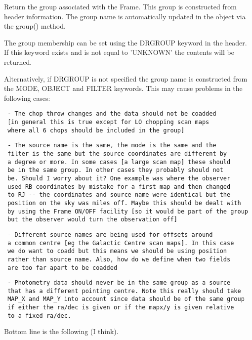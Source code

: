 \begin{description}
Return the group associated with the Frame. This group is constructed
from header information. The group name is automatically updated in
the object via the group() method.



The group membership can be set using the DRGROUP keyword in the
header. If this keyword exists and is not equal to 'UNKNOWN' the
contents will be returned.



Alternatively, if DRGROUP is not specified the group name is
constructed from the MODE, OBJECT and FILTER keywords. This may cause
problems in the following cases:

\begin{verbatim}
 - The chop throw changes and the data should not be coadded
 [in general this is true except for LO chopping scan maps
 where all 6 chops should be included in the group]
\end{verbatim}
\begin{verbatim}
 - The source name is the same, the mode is the same and the
 filter is the same but the source coordinates are different by
 a degree or more. In some cases [a large scan map] these should
 be in the same group. In other cases they probably should not
 be. Should I worry about it? One example was where the observer
 used RB coordinates by mistake for a first map and then changed
 to RJ -- the coordinates and source name were identical but the
 position on the sky was miles off. Maybe this should be dealt with
 by using the Frame ON/OFF facility [so it would be part of the group
 but the observer would turn the observation off]
\end{verbatim}
\begin{verbatim}
 - Different source names are being used for offsets around
 a common centre [eg the Galactic Centre scan maps]. In this case
 we do want to coadd but this means we should be using position
 rather than source name. Also, how do we define when two fields
 are too far apart to be coadded
\end{verbatim}
\begin{verbatim}
 - Photometry data should never be in the same group as a source
 that has a different pointing centre. Note this really should take
 MAP_X and MAP_Y into account since data should be of the same group
 if either the ra/dec is given or if the mapx/y is given relative
 to a fixed ra/dec.
\end{verbatim}


Bottom line is the following (I think).




\end{description}
